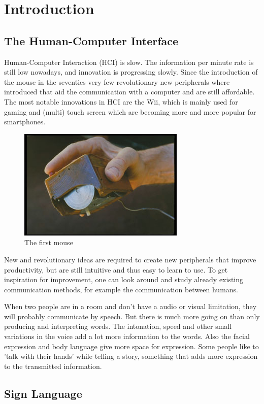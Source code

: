 
\chapter{Introduction}
\label{ch:intro}

\section{The Human-Computer Interface}


Human-Computer Interaction (HCI) is slow. The information per minute rate is still low nowadays, and innovation is progressing slowly. Since the introduction of the mouse in the seventies very few revolutionary new peripherals where introduced that aid the communication with a computer and are still affordable. The most notable innovations in HCI are the Wii, which is mainly used for gaming and (multi) touch screen which are becoming more and more popular for smartphones.

\begin{figure}[htbp]
	\center{}
	\label{fig:mouse}
	\includegraphics[width=0.3\linewidth]{figures/mouse.jpg}
	\caption{The first mouse}
\end{figure}

New and revolutionary ideas are required to create new peripherals that improve productivity, but are still intuitive and thus easy to learn to use. To get inspiration for improvement, one can look around and study already existing communication methods, for example the communication between humans. 

When two people are in a room and don't have a audio or visual limitation, they will probably communicate by speech. But there is much more going on than only producing and interpreting words. The intonation, speed and other small variations in the voice add a lot more information to the words. Also the facial expression and body language give more space for expression. Some people like to 'talk with their hands' while telling a story, something that adds more expression to the transmitted information.

\section{Sign Language}

